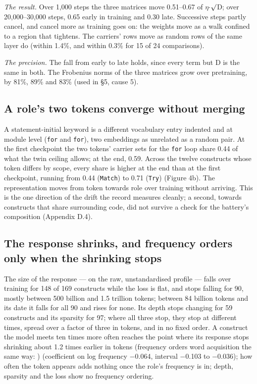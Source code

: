 \documentclass{article}
\begin{document}
\emph{The result.} Over 1,000 steps the three matrices move 0.51--0.67 of $\eta$$\cdot$$\surd$D; over 20,000--30,000 steps, 0.65 early in training and 0.30 late. Successive steps partly cancel, and cancel more as training goes on: the weights move as a walk confined to a region that tightens. The carriers' rows move as random rows of the same layer do (within 1.4\%, and within 0.3\% for 15 of 24 comparisons).

\emph{The precision.} The fall from early to late holds, since every term but D is the same in both. The Frobenius norms of the three matrices grow over pretraining, by 81\%, 89\% and 83\% (used in \S5, cause 5).

\subsection{A role's two tokens converge without merging}

A statement-initial keyword is a different vocabulary entry indented and at module level (\texttt{\textvisiblespace{}for} and \texttt{for}), two embeddings as unrelated as a random pair. At the first checkpoint the two tokens' carrier sets for the \texttt{for} loop share 0.44 of what the twin ceiling allows; at the end, 0.59. Across the twelve constructs whose token differs by scope, every share is higher at the end than at the first checkpoint, running from 0.44 (\texttt{Match}) to 0.71 (\texttt{Try}) (Figure 4b). The representation moves from token towards role over training without arriving. This is the one direction of the drift the record measures cleanly; a second, towards constructs that share surrounding code, did not survive a check for the battery's composition (Appendix D.4).

\subsection{The response shrinks, and frequency orders only when the shrinking stops}

The size of the response --- on the raw, unstandardised profile --- falls over training for 148 of 169 constructs while the loss is flat, and stops falling for 90, mostly between 500 billion and 1.5 trillion tokens; between 84 billion tokens and its date it falls for all 90 and rises for none. Its depth stops changing for 59 constructs and its sparsity for 97; where all three stop, they stop at different times, spread over a factor of three in tokens, and in no fixed order. A construct the model meets ten times more often reaches the point where its response stops shrinking about 1.2 times earlier in tokens (frequency orders word acquisition the same way: \citealp{chang2022}) (coefficient on log frequency $-$0.064, interval $-$0.103 to $-$0.036); how often the token appears adds nothing once the role's frequency is in; depth, sparsity and the loss show no frequency ordering.
\end{document}
